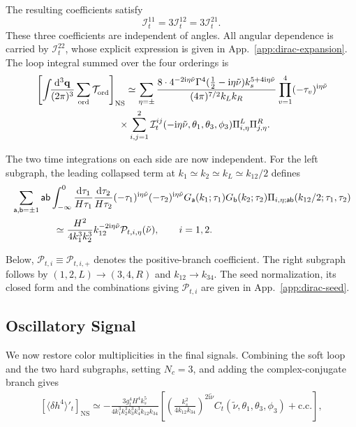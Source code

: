 \documentclass[a4paper,12pt]{article}
\newcommand{\ii}{\mathrm i}
\newcommand{\mb}{\mathbf}
\newcommand{\tn}{\tilde\nu}
\def\aa{\mathsf a}
\newcommand{\bb}{\mathsf b}
\newcommand{\di}{\mathrm d}
\begin{document}
The resulting coefficients satisfy
\begin{equation}
 \mathcal I^{11}_t=3\mathcal I^{12}_t=3\mathcal I^{21}_t.
 \label{eq:dirac-loop-relations}
\end{equation}
These three coefficients are independent of angles. All angular
dependence is carried by $\mathcal I_t^{22}$, whose explicit expression
is given in App.~\ref{app:dirac-expansion}.
The loop integral summed over the four orderings is
\begin{align}
 & \left[ \int_{}\frac{\di^3\mb q}{(2\pi)^3}
 \sum_{\mathrm{ord}}\mathcal T^{\mathrm{}}_{\mathrm{ord}} \right]_{\mathrm{NS}}
 \simeq \sum_{\eta=\pm} \frac{8\cdot4^{-2\ii\eta\tn}\Gamma^4(\tfrac12-\ii\eta\tn)
 k_s^{5+4\ii\eta\tn}}{(4\pi)^{7/2}k_Lk_R}
 \prod_{v=1}^4(-\tau_v)^{\ii\eta\tn}\nonumber\\
 &\hspace{30mm}\times
 \sum_{i,j=1}^2\mathcal I^{ij}_t(-\ii\eta\tn,\theta_1,\theta_3,\phi_3)
 \Pi^L_{i,\eta}\Pi^R_{j,\eta}.
 \label{eq:dirac-cut-loop}
\end{align}

The two time integrations on each side are now independent.
For the left subgraph, the leading collapsed term at
$k_1\simeq k_2\simeq k_L\simeq k_{12}/2$ defines
\begin{align}
 &\sum_{\aa,\bb=\pm1}\aa\bb
 \int_{-\infty}^0\frac{\di\tau_1}{H\tau_1}\frac{\di\tau_2}{H\tau_2}
 (-\tau_1)^{\ii\eta\tn}(-\tau_2)^{\ii\eta\tn}
 G_\aa(k_1;\tau_1)G_\bb(k_2;\tau_2)
 \Pi_{i,\eta;\aa\bb}(k_{12}/2;\tau_1,\tau_2)\nonumber\\
 &\hspace{15mm}\simeq\frac{H^2}{4k_1^3k_2^3}
 k_{12}^{-2\ii\eta\tn}\mathcal P_{t,i,\eta}(\tn),
 \qquad i=1,2.
 \label{eq:dirac-time-definition}
\end{align}

Below, $\mathcal P_{t,i}\equiv\mathcal P_{t,i,+}$ denotes the
positive-branch coefficient. The right subgraph follows by
$(1,2,L)\to(3,4,R)$ and $k_{12}\to k_{34}$.
The seed normalization, its closed form and the combinations giving
$\mathcal P_{t,i}$ are given in App.~\ref{app:dirac-seed}.

\subsection{Oscillatory Signal}
\label{sec:dirac-clock}
We now restore color multiplicities in the final signals.
Combining the soft loop and the two hard subgraphs, setting $N_c=3$,
and adding the complex-conjugate branch gives
\begin{align}
 \left[\langle\delta h^4\rangle'_t\right]_{\mathrm{NS}}
 \simeq-\frac{3g_t^4H^4k_s^5}
 {4k_1^3k_2^3k_3^3k_4^3k_{12}k_{34}}
 \left[\left(\frac{k_s^2}{4k_{12}k_{34}}\right)^{2\ii\tn}
 C_t(\tn,\theta_1,\theta_3,\phi_3)+\text{c.c.}\right],
 \label{eq:dirac-clock-signal}
\end{align}
\end{document}
